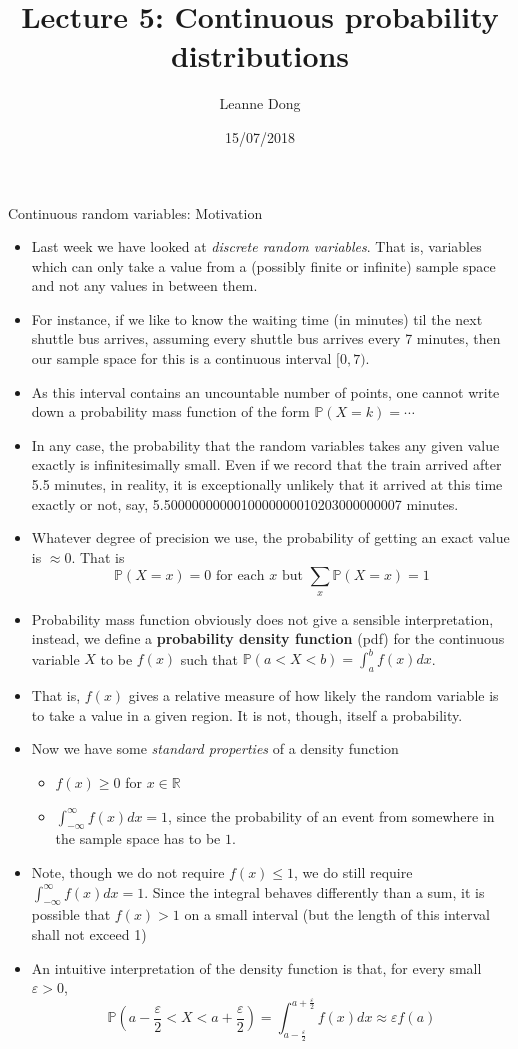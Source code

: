 \documentclass[ignorenonframetext,]{beamer}
\title{Lecture 5: Continuous probability distributions}
\author{Leanne Dong}
\date{15/07/2018}
\begin{document}
\frame{\titlepage}

\begin{frame}{Continuous random variables: Motivation}

\begin{itemize}
\item
  Last week we have looked at \emph{discrete random variables}. That is,
  variables which can only take a value from a (possibly finite or
  infinite) sample space and not any values in between them.
\item
  For instance, if we like to know the waiting time (in minutes) til the
  next shuttle bus arrives, assuming every shuttle bus arrives every 7
  minutes, then our sample space for this is a continuous interval
  \([0,7)\).
\item
  As this interval contains an uncountable number of points, one cannot
  write down a probability mass function of the form
  \(\mathbb{P}(X=k)=\cdots\)
\item
  In any case, the probability that the random variables takes any given
  value exactly is infinitesimally small. Even if we record that the
  train arrived after 5.5 minutes, in reality, it is exceptionally
  unlikely that it arrived at this time exactly or not, say,
  5.5000000000010000000010203000000007 minutes.
\item
  Whatever degree of precision we use, the probability of getting an
  exact value is \(\approx 0\). That is
  \[\mathbb{P}(X=x)=0\,\,\text{for each}\,\,x\,\,\text{but}\,\,\sum_x \mathbb{P}(X=x)=1 \]
\item
  Probability mass function obviously does not give a sensible
  interpretation, instead, we define a \textbf{probability density
  function} (pdf) for the continuous variable \(X\) to be \(f(x)\) such
  that \(\mathbb{P}(a<X<b)=\int^b_a f(x)dx\).
\item
  That is, \(f(x)\) gives a relative measure of how likely the random
  variable is to take a value in a given region. It is not, though,
  itself a probability.
\item
  Now we have some \emph{standard properties} of a density function

  \begin{itemize}
  \item
    \(f(x)\ge 0\) for \(x\in\mathbb{R}\)
  \item
    \(\int^{\infty}_{-\infty}f(x)dx=1\), since the probability of an
    event from somewhere in the sample space has to be \(1\).
  \end{itemize}
\item
  Note, though we do not require \(f(x)\le 1\), we do still require
  \(\int^{\infty}_{-\infty}f(x)dx=1\). Since the integral behaves
  differently than a sum, it is possible that \(f(x)>1\) on a small
  interval (but the length of this interval shall not exceed 1)
\item
  An intuitive interpretation of the density function is that, for every
  small \(\varepsilon>0\),
  \[\mathbb{P}(a-\frac{\varepsilon}{2}<X<a+\frac{\varepsilon}{2})=\int^{a+\frac{\varepsilon}{2}}_{a-\frac{\varepsilon}{2}}f(x)dx\approx\varepsilon f(a)\]


\end{itemize}
\end{frame}
\end{document}
